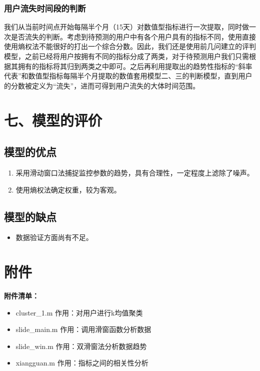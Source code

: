 \documentclass{my_paper}
\begin{document}
\subsubsection{用户流失时间段的判断}
我们从当前时间点开始每隔半个月（15天）对数值型指标进行一次提取，同时做一次是否流失的判断。考虑到待预测的用户中有各个用户具有的指标不同，使用直接使用熵权法不能很好的打出一个综合分数。因此，我们还是使用前几问建立的评判模型，之前已经将用户按拥有不同的指标分成了两类，对于待预测用户我们只需根据其拥有的指标将其归到两类之中即可。之后再利用提取出的趋势性指标的“斜率代表”和数值型指标每隔半个月提取的数值套用模型二、三的判断模型，直到用户的分数被定义为“流失”，进而可得到用户流失的大体时间范围。
\section{七、模型的评价}

\subsection{模型的优点}
\begin{enumerate}
    \item 采用滑动窗口法捕捉监控参数的趋势，具有合理性，一定程度上滤除了噪声。
    \item 使用熵权法确定权重，较为客观。

\end{enumerate}

\subsection{模型的缺点}
\begin{itemize}
    \item 数据验证方面尚有不足。

\end{itemize}

\newpage
\begin{center}
\end{center}

\newpage
\section{附件}
\textbf{附件清单：}
\renewcommand\theenumi{\roman{enumi}}
\renewcommand\labelenumi{\textbf{附录\theenumi}}
\begin{itemize}
    \item  cluster\_1.m  作用：对用户进行k均值聚类

 
    \item  slide\_main.m 作用：调用滑窗函数分析数据
   
    \item  slide\_win.m   作用：双滑窗法分析数据趋势
    \item  xiangguan.m 作用：指标之间的相关性分析
\end{itemize}
\end{document}
